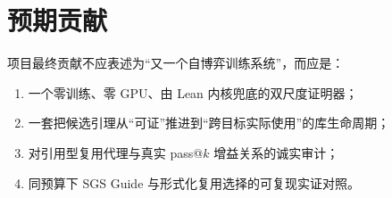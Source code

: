 \documentclass[UTF8,a4paper,11pt,fontset=windows]{ctexart}
\begin{document}
\section{预期贡献}

项目最终贡献不应表述为“又一个自博弈训练系统”，而应是：

\begin{enumerate}[leftmargin=1.8em,itemsep=3pt]
  \item 一个零训练、零 GPU、由 Lean 内核兜底的双尺度证明器；
  \item 一套把候选引理从“可证”推进到“跨目标实际使用”的库生命周期；
  \item 对引用型复用代理与真实 pass@$k$ 增益关系的诚实审计；
  \item 同预算下 SGS Guide 与形式化复用选择的可复现实证对照。
\end{enumerate}
\end{document}
